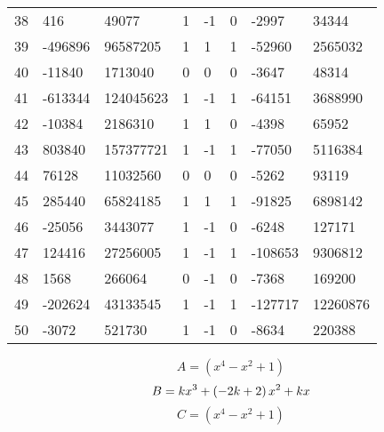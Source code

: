 \documentclass{amsart}
\begin{document}
\begin{longtable}{|l|l|l|lllll|}
38&416&49077&1&-1&0&-2997&34344\\
39&-496896&96587205&1&1&1&-52960&2565032\\
40&-11840&1713040&0&0&0&-3647&48314\\
41&-613344&124045623&1&-1&1&-64151&3688990\\
42&-10384&2186310&1&1&0&-4398&65952\\
43&803840&157377721&1&-1&1&-77050&5116384\\
44&76128&11032560&0&0&0&-5262&93119\\
45&285440&65824185&1&1&1&-91825&6898142\\
46&-25056&3443077&1&-1&0&-6248&127171\\
47&124416&27256005&1&-1&1&-108653&9306812\\
48&1568&266064&0&-1&0&-7368&169200\\
49&-202624&43133545&1&-1&1&-127717&12260876\\
50&-3072&521730&1&-1&0&-8634&220388\\
\hline
\end{longtable}
$$A=(x^4
 - x^2
 + 1)$$
$$B=k\*x^3
 + \left(-2\*k
 + 2\right) \*x^2
 + k\*x$$
$$C=(x^4
 - x^2
 + 1)$$
\end{document}

